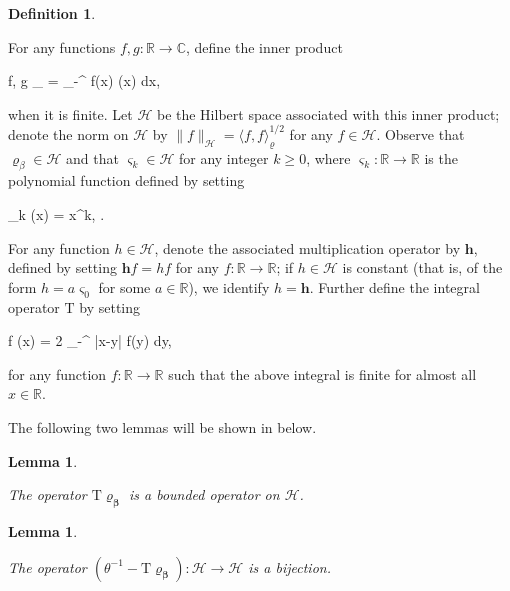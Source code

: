 \documentclass{amsart}
\numberwithin{equation}{section}
\newtheorem{lem}[thm]{Lemma}
\theoremstyle{remark}
\theoremstyle{definition}
\newtheorem{definition}[thm]{Definition}
\begin{document}
	
	\begin{definition}
			\label{tbeta} 
	
		For any functions $f, g : \mathbb{R} \rightarrow \mathbb{C}$, define the inner product
		\begin{flalign}
			\label{betaproduct} 
			\langle f, g \rangle_{\varrho} = \displaystyle\int_{-\infty}^{\infty} f(x)  \varrho (x) dx,
		\end{flalign}
		
		\noindent when it is finite. Let $\mathcal{H}$ be the Hilbert space associated with this inner product; denote the norm on $\mathcal{H}$ by $\| f \|_{\mathcal{H}} = \langle f, f \rangle_{\varrho}^{1/2}$ for any $f \in \mathcal{H}$. Observe that $\varrho_{\beta} \in \mathcal{H}$ and that $\varsigma_k \in \mathcal{H}$ for any integer $k \ge 0$, where $\varsigma_k : \mathbb{R} \rightarrow \mathbb{R}$ is the polynomial function defined by setting 
		\begin{flalign}
			\label{kx} 
			\varsigma_k (x) = x^k, \qquad \text{for all $x \in \mathbb{R}$}.
		\end{flalign}
		
		\noindent For any function $h \in \mathcal{H}$, denote the associated multiplication operator by $\bm{h}$, defined by setting $\bm{h} f = hf$ for any $f : \mathbb{R} \rightarrow \mathbb{R}$; if $h \in \mathcal{H}$ is constant (that is, of the form $h = a \varsigma_0$ for some $a \in \mathbb{R}$), we identify $h = \bm{h}$. Further define the integral operator $\bm{\mathrm{T}}$ by setting  
		\begin{flalign}
			\label{operatort}
			 f (x) = 2 \displaystyle\int_{-\infty}^{\infty} \log |x-y| f(y) dy,
		\end{flalign}
		
		\noindent for any function $f : \mathbb{R} \rightarrow \mathbb{R}$ such that the above integral is finite for almost all $x \in \mathbb{R}$. 
		
	\end{definition} 
	
	The following two lemmas will be shown in  below. 
	
	\begin{lem} 
		\label{trhobounded} 
		
		The operator $\bm{\mathrm{T} \varrho_{\beta}}$ is a bounded operator on $\mathcal{H}$. 
		
	\end{lem} 
	
	
	\begin{lem} 
		\label{trho} 
		
		The operator $(\theta^{-1} - \bm{\mathrm{T}} \bm{\varrho_{\beta}}): \mathcal{H} \rightarrow \mathcal{H}$ is a bijection.
	\end{lem} 
	
\end{document}
